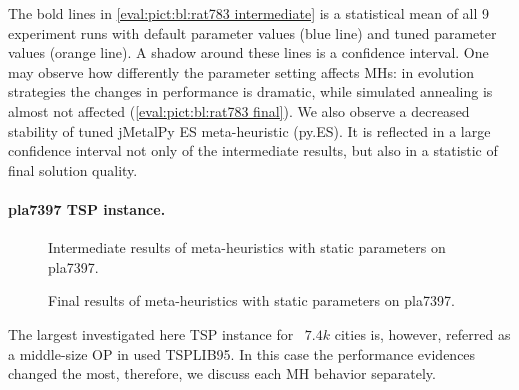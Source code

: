 The bold lines in \cref{eval:pict:bl:rat783 intermediate} is a statistical mean of all 9 experiment runs with default parameter values (blue line) and tuned parameter values (orange line). A shadow around these lines is a confidence interval. One may observe how differently the parameter setting affects MHs: in evolution strategies the changes in performance is dramatic, while simulated annealing is almost not affected (\cref{eval:pict:bl:rat783 final}). We also observe a decreased stability of tuned jMetalPy ES meta-heuristic (py.ES). It is reflected in a large confidence interval not only of the intermediate results, but also in a statistic of final solution quality.


\paragraph{pla7397 TSP instance.} 

\begin{figure}[b]
	\centering
	\vspace{-20pt}
	
	\caption{Intermediate results of meta-heuristics with static parameters on pla7397.}
	\vspace{-5pt}
	\label{eval:pict:bl:pla7397 intermediate}
\end{figure}

\begin{wrapfigure}{R}{0.5\textwidth}%
	\centering
	
	\label{eval:pict:bl:pla7397 final}
	\caption{Final results of meta-heuristics with static parameters on pla7397.}
	\vspace{-10pt}
\end{wrapfigure}

The largest investigated here TSP instance for ~$7.4k$ cities is, however, referred as a middle-size OP in used TSPLIB95. In this case the performance evidences changed the most, therefore, we discuss each MH behavior separately.

